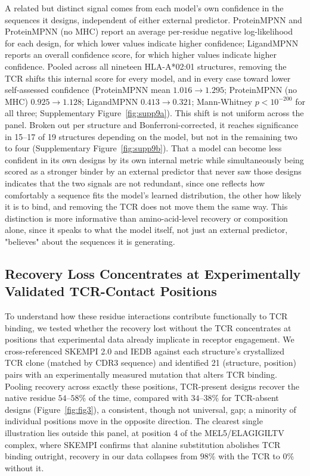 \documentclass[letterpaper]{article}
\begin{document}
A related but distinct signal comes from each model's own confidence in the sequences it designs,
independent of either external predictor. ProteinMPNN and ProteinMPNN (no MHC) report an average
per-residue negative log-likelihood for each design, for which lower values indicate higher confidence;
LigandMPNN reports an overall confidence score, for which higher values indicate higher confidence.
Pooled across all nineteen HLA-A*02:01 structures, removing the TCR shifts this internal score for every
model, and in every case toward lower self-assessed confidence (ProteinMPNN mean $1.016\to1.295$;
ProteinMPNN (no MHC) $0.925\to1.128$; LigandMPNN $0.413\to0.321$; Mann-Whitney $p<10^{-200}$ for all
three; Supplementary Figure~\ref{fig:supp9a}). This shift is not uniform across the panel. Broken out per
structure and Bonferroni-corrected, it reaches significance in 15--17 of 19 structures depending on the
model, but not in the remaining two to four (Supplementary Figure~\ref{fig:supp9b}). That a model can
become less confident in its own designs by its own internal metric while simultaneously being scored as
a stronger binder by an external predictor that never saw those designs indicates that the two signals
are not redundant, since one reflects how comfortably a sequence fits the model's learned distribution, the
other how likely it is to bind, and removing the TCR does not move them the same way. This distinction is
more informative than amino-acid-level recovery or composition alone, since it speaks to what the model
itself, not just an external predictor, "believes" about the sequences it is generating.

\subsection{Recovery Loss Concentrates at Experimentally Validated TCR-Contact Positions}
\label{sec:skempi}

To understand how these residue interactions contribute functionally to TCR binding, we tested whether
the recovery lost without the TCR concentrates at positions that experimental data already implicate in
receptor engagement. We cross-referenced SKEMPI 2.0 and IEDB against each structure's
crystallized TCR clone (matched by CDR3 sequence) and identified 21 (structure, position) pairs with an
experimentally measured mutation that alters TCR binding. Pooling recovery across exactly these
positions, TCR-present designs recover the native residue $54$--$58\%$ of the time, compared with
$34$--$38\%$ for TCR-absent designs (Figure~\ref{fig:fig3}), a consistent, though not universal, gap; a
minority of individual positions move in the opposite direction. The clearest single illustration lies
outside this panel, at position 4 of the MEL5/ELAGIGILTV complex, where SKEMPI confirms that alanine
substitution abolishes TCR binding outright, recovery in our data collapses from $98\%$ with the TCR to
$0\%$ without it.
\end{document}
